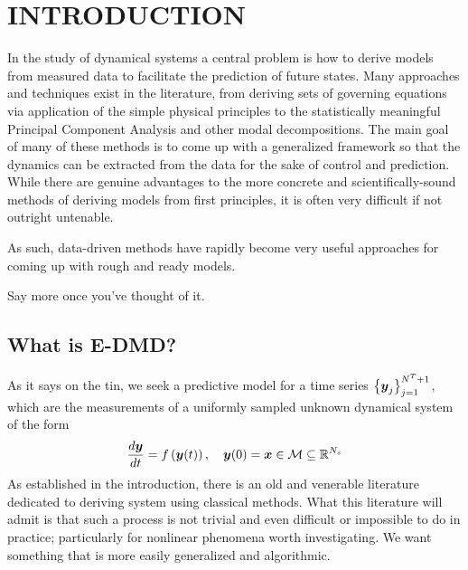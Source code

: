 %

\chapter{INTRODUCTION}
\label{chap:intro}

In the study of dynamical systems a central problem is how to derive models 
from measured data to facilitate the prediction of future states. Many 
approaches and techniques exist in the literature, from deriving sets of 
governing equations via application of the simple physical principles to 
the statistically meaningful Principal Component Analysis and other modal 
decompositions. The main goal of many of these methods is to come up with 
a generalized framework so that the dynamics can be extracted from the data
for the sake of control and prediction. While there are genuine advantages
to the more concrete and scientifically-sound methods of deriving models 
from first principles, it is often very difficult if not outright untenable.

As such, data-driven methods have rapidly become very useful approaches for 
coming up with rough and ready models. 

Say more once you've thought of it.

\section{What is E-DMD?}
As it says on the tin, we seek a predictive model for a time series $\left\{
\boldsymbol{y}_j\right\}_{j=1}^{N^T+1}$, which are the measurements of a uniformly 
sampled unknown dynamical system of the form
$$\frac{d\boldsymbol{y}}{dt} = f\left(\boldsymbol{y}(t)\right),\quad \boldsymbol{y}(0) 
= \boldsymbol{x} \in \mathcal{M} \subseteq \mathbb{R}^{N_s}$$
As established in the introduction, there is an old and venerable literature 
dedicated to deriving system using classical methods. What this literature will 
admit is that such a process is not trivial and even difficult or impossible to 
do in practice; particularly for nonlinear phenomena worth investigating. We 
want something that is more easily generalized and algorithmic.

